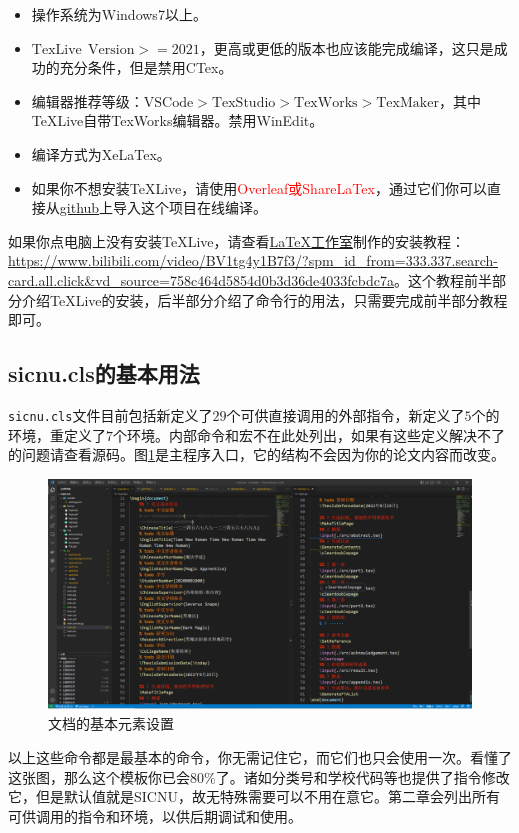 \begin{tcolorbox}[colback=gray!10,
    colframe=black,
    width=16cm,
    arc=1mm, auto outer arc,
    boxrule=0.5pt,]
    \begin{itemize}
        \item 操作系统为Windows7以上。
        \item $\mathrm{TexLive~~Version >= 2021}$，更高或更低的版本也应该能完成编译，这只是成功的充分条件，但是禁用CTex。
        \item 编辑器推荐等级：$\mathrm{VSCode > TexStudio > TexWorks > TexMaker}$，其中TeXLive自带TexWorks编辑器。禁用WinEdit。
        \item 编译方式为XeLaTex。
        \item 如果你不想安装TeXLive，请使用\textcolor{red}{Overleaf或ShareLaTex}，通过它们你可以直接从\href{github}{github}上导入这个项目在线编译。
    \end{itemize}
\end{tcolorbox}
如果你点电脑上没有安装TeXLive，请查看\href{https://www.bilibili.com/video/BV1tg4y1B7f3/?spm_id_from=333.337.search-card.all.click&vd_source=758c464d5854d0b3d36de4033fcbdc7a}{\LaTeX 工作室}制作的安装教程：\url{https://www.bilibili.com/video/BV1tg4y1B7f3/?spm_id_from=333.337.search-card.all.click&vd_source=758c464d5854d0b3d36de4033fcbdc7a}。这个教程前半部分介绍TeXLive的安装，后半部分介绍了命令行的用法，只需要完成前半部分教程即可。

\subsection{sicnu.cls的基本用法}

\par \verb|sicnu.cls|文件目前包括新定义了$29$个可供直接调用的外部指令，新定义了$5$个的环境，重定义了$7$个环境。内部命令和宏不在此处列出，如果有这些定义解决不了的问题请查看源码。图\ref{fig:basevar}是主程序入口，它的结构不会因为你的论文内容而改变。
\begin{figure}[H]
    \centering
    \includegraphics[scale=0.3]{img/struct.png}
    \caption{文档的基本元素设置}
    \label{fig:basevar}
\end{figure}
以上这些命令都是最基本的命令，你无需记住它，而它们也只会使用一次。看懂了这张图，那么这个模板你已会$80\%$了。诸如分类号和学校代码等也提供了指令修改它，但是默认值就是SICNU，故无特殊需要可以不用在意它。第二章会列出所有可供调用的指令和环境，以供后期调试和使用。


